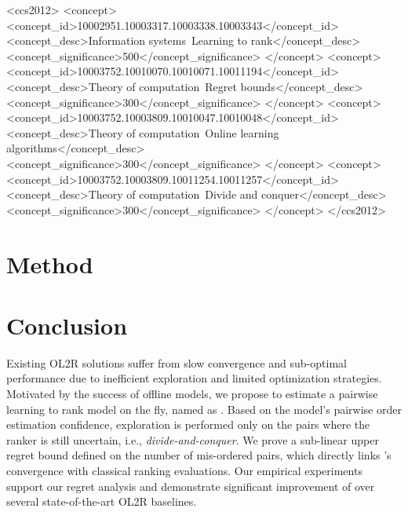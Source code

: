 \documentclass[sigconf]{acmart}
\theoremstyle{definition}
\theoremstyle{remark}
\begin{document}

\begin{CCSXML}
<ccs2012>
   <concept>
       <concept_id>10002951.10003317.10003338.10003343</concept_id>
       <concept_desc>Information systems~Learning to rank</concept_desc>
       <concept_significance>500</concept_significance>
       </concept>
   <concept>
       <concept_id>10003752.10010070.10010071.10011194</concept_id>
       <concept_desc>Theory of computation~Regret bounds</concept_desc>
       <concept_significance>300</concept_significance>
       </concept>
   <concept>
       <concept_id>10003752.10003809.10010047.10010048</concept_id>
       <concept_desc>Theory of computation~Online learning algorithms</concept_desc>
       <concept_significance>300</concept_significance>
       </concept>
   <concept>
       <concept_id>10003752.10003809.10011254.10011257</concept_id>
       <concept_desc>Theory of computation~Divide and conquer</concept_desc>
       <concept_significance>300</concept_significance>
       </concept>
 </ccs2012>
\end{CCSXML}



\maketitle



\section{Method}






\section{Conclusion}
Existing OL2R solutions suffer from slow convergence and sub-optimal performance due to inefficient exploration and limited optimization strategies. Motivated by the success of offline models, we propose to estimate a pairwise learning to rank model on the fly, named as \model{}. 
Based on the model's pairwise order estimation confidence, exploration is performed only on the pairs where the ranker is still uncertain, i.e., \emph{divide-and-conquer}. 
We prove a sub-linear upper regret bound defined on the number of mis-ordered pairs, which directly links \model{}'s convergence with classical ranking evaluations.  
Our empirical experiments support our regret analysis and demonstrate significant improvement of \model{} over several state-of-the-art OL2R baselines. 
\end{document}
